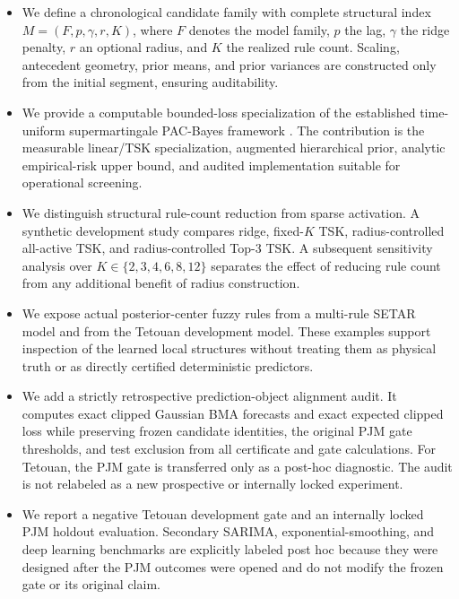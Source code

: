 \begin{itemize}
	\item We define a chronological candidate family with complete structural
	index $M=(F,p,\gamma,r,K)$, where $F$ denotes the model family, $p$ the
	lag, $\gamma$ the ridge penalty, $r$ an optional radius, and $K$ the realized
	rule count. Scaling, antecedent geometry, prior means, and prior variances are constructed only from the initial segment, ensuring auditability.
	\item We provide a computable bounded-loss specialization of the established	time-uniform supermartingale PAC-Bayes framework \cite{chugg2023unified}. The contribution is the measurable linear/TSK specialization, augmented hierarchical prior, analytic empirical-risk upper bound, and audited	implementation suitable for operational screening.
	\item We distinguish structural rule-count reduction from sparse activation.
	A synthetic development study compares ridge, fixed-$K$ TSK, radius-controlled
	all-active TSK, and radius-controlled Top-3 TSK. A subsequent sensitivity
	analysis over $K \in \{2,3,4,6,8,12\}$ separates the effect of reducing rule
	count from any additional benefit of radius construction.
	\item We expose actual posterior-center fuzzy rules from a multi-rule SETAR
	model and from the Tetouan development model. These examples support
	inspection of the learned local structures without treating them as physical
	truth or as directly certified deterministic predictors.
	\item We add a strictly retrospective prediction-object alignment audit.
	It computes exact clipped Gaussian BMA forecasts and exact expected clipped
	loss while preserving frozen candidate identities, the original PJM gate
	thresholds, and test exclusion from all certificate and gate calculations.
	For Tetouan, the PJM gate is transferred only as a post-hoc diagnostic.
	The audit is not relabeled as a new prospective or internally locked
	experiment.
	\item We report a negative Tetouan development gate and an internally locked
	PJM holdout evaluation. Secondary SARIMA, exponential-smoothing, and deep
	learning benchmarks are explicitly labeled post hoc because they were designed
	after the PJM outcomes were opened and do not modify the frozen gate or its
	original claim.
\end{itemize}

